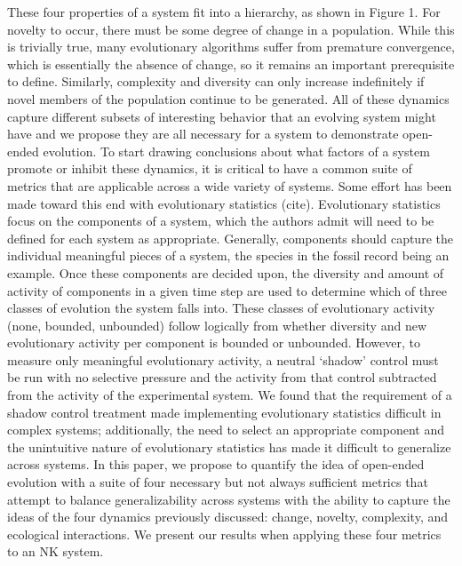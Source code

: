 \documentclass[letterpaper]{article}
\begin{document}
These four properties of a system fit into a hierarchy, as shown in Figure 1. For novelty to occur, there must be some degree of change in a population. While this is trivially true, many evolutionary algorithms suffer from premature convergence, which is essentially the absence of change, so it remains an important prerequisite to define. Similarly, complexity and diversity can only increase indefinitely if novel members of the population continue to be generated. All of these dynamics capture different subsets of interesting behavior that an evolving system might have and we propose they are all necessary for a system to demonstrate open-ended evolution.
To start drawing conclusions about what factors of a system promote or inhibit these dynamics, it is critical to have a common suite of metrics that are applicable across a wide variety of systems. Some effort has been made toward this end with evolutionary statistics (cite). Evolutionary statistics focus on the components of a system, which the authors admit will need to be defined for each system as appropriate. Generally, components should capture the individual meaningful pieces of a system, the species in the fossil record being an example. Once these components are decided upon, the diversity and amount of activity of components in a given time step are used to determine which of three classes of evolution the system falls into. These classes of evolutionary activity (none, bounded, unbounded) follow logically from whether diversity and new evolutionary activity per component is bounded or unbounded. However, to measure only meaningful evolutionary activity, a neutral `shadow' control must be run with no selective pressure and the activity from that control subtracted from the activity of the experimental system. We found that the requirement of a shadow control treatment made implementing evolutionary statistics difficult in complex systems; additionally, the need to select an appropriate component and the unintuitive nature of evolutionary statistics has made it difficult to generalize across systems. 
In this paper, we propose to quantify the idea of open-ended evolution with a suite of four necessary but not always sufficient metrics that attempt to balance generalizability across systems with the ability to capture the ideas of the four dynamics previously discussed: change, novelty, complexity, and ecological interactions. We present our results when applying these four metrics to an NK system.
\end{document}
